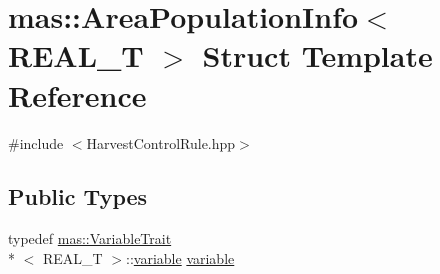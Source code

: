 \hypertarget{structmas_1_1_area_population_info}{\section{mas\-:\-:Area\-Population\-Info$<$ R\-E\-A\-L\-\_\-\-T $>$ Struct Template Reference}
\label{structmas_1_1_area_population_info}
}


{\ttfamily \#include $<$Harvest\-Control\-Rule.\-hpp$>$}

\subsection*{Public Types}
\begin{DoxyCompactItemize}
\item 
typedef \hyperlink{structmas_1_1_variable_trait}{mas\-::\-Variable\-Trait}\\*
$<$ R\-E\-A\-L\-\_\-\-T $>$\-::\hyperlink{structmas_1_1_area_population_info_a154b6c5cf71d1241e90b0f0173dbe32c}{variable} \hyperlink{structmas_1_1_area_population_info_a154b6c5cf71d1241e90b0f0173dbe32c}{variable}
\end{DoxyCompactItemize}
